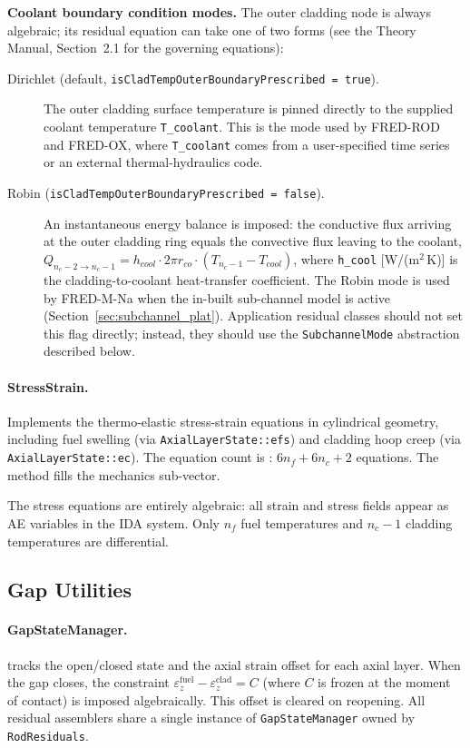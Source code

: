 \documentclass[11pt,a4paper]{article}
\begin{document}
\textbf{Coolant boundary condition modes.} The outer cladding node is always algebraic; its residual equation can take one of two forms (see the Theory Manual, Section~2.1 for the governing equations):
\begin{description}
  \item[Dirichlet (default, \texttt{isCladTempOuterBoundaryPrescribed = true}).] The outer cladding surface temperature is pinned directly to the supplied coolant temperature \texttt{T\_coolant}.  This is the mode used by FRED-ROD and FRED-OX, where \texttt{T\_coolant} comes from a user-specified time series or an external thermal-hydraulics code.
  \item[Robin (\texttt{isCladTempOuterBoundaryPrescribed = false}).] An instantaneous energy balance is imposed: the conductive flux arriving at the outer cladding ring equals the convective flux leaving to the coolant, $Q_{n_c-2\to n_c-1} = h_{cool}\cdot 2\pi r_{co}\cdot(T_{n_c-1} - T_{cool})$, where \texttt{h\_cool} [W/(m$^2$\,K)] is the cladding-to-coolant heat-transfer coefficient.  The Robin mode is used by FRED-M-Na when the in-built sub-channel model is active (Section~\ref{sec:subchannel_plat}). Application residual classes should not set this flag directly; instead, they should use the \texttt{SubchannelMode} abstraction described below.
\end{description}

\paragraph{StressStrain.}
Implements the thermo-elastic stress-strain equations in cylindrical geometry, including fuel swelling (via \texttt{AxialLayerState::efs}) and cladding hoop creep (via \texttt{AxialLayerState::ec}).  The equation count is : $6 n_f + 6 n_c + 2$ equations.  The method  fills the mechanics sub-vector.

The stress equations are entirely algebraic: all strain and stress fields appear as AE variables in the IDA system.  Only $n_f$ fuel temperatures and $n_c - 1$ cladding temperatures are differential.

\subsection{Gap Utilities}
\label{sec:gap_utils}

\paragraph{GapStateManager.}
 tracks the open/closed state and the axial strain offset for each axial layer.  When the gap closes, the constraint $\varepsilon_z^\text{fuel} - \varepsilon_z^\text{clad} = C$ (where $C$ is frozen at the moment of contact) is imposed algebraically.  This offset is cleared on reopening.  All residual assemblers share a single instance of \texttt{GapStateManager} owned by \texttt{RodResiduals}.
\end{document}
